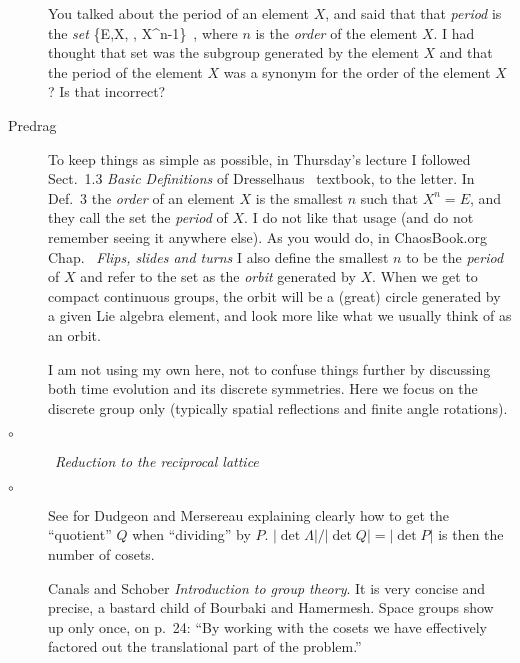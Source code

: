 \begin{description}
  \item[\student] %
You talked about the period of an element $X$, and said that that \emph{period}
is the \emph{set}
\beq
\{E,X, \cdots, X^{n-1}\}
\,,
where $n$ is the \emph{order} of the element $X$. I had thought that set was the
subgroup generated by the element $X$ and that the period of the element $X$
was a synonym for the order of the element $X$? Is that incorrect?

  \item[Predrag] %
                                         \toCB
To keep things as simple as possible, in Thursday's lecture I followed
Sect.~1.3 {\em Basic Definitions} of Dresselhaus \etal\
textbook, to the letter.
In Def.~3 the \emph{order} of an element $X$ is the smallest $n$
such that $X^n=E$, and they call the set \refeq{Xorbit} the \emph{period} of
$X$. I do not like that usage (and do not remember seeing it anywhere else).
As you would do, in ChaosBook.org
Chap.~ {\emph{Flips, slides
and turns}} I also define the smallest $n$ to be the \emph{period} of $X$ and
refer to the set \refeq{Xorbit} as the \emph{orbit} generated by $X$. When we
get to compact continuous groups, the orbit will be a (great) circle
generated by a given Lie algebra element, and look more like what we usually
think of as an orbit.

I am not using my own \wwwcb{} here, not to confuse things further by
discussing both time evolution and its discrete symmetries. Here we focus on
the discrete group only (typically spatial reflections and finite angle
rotations).

        \item[$\circ$]
~{\em Reduction to the reciprocal lattice}

        \item[$\circ$]
See  for
Dudgeon and Mersereau explaining clearly how to get the
``quotient'' $Q$ when ``dividing'' by $P$. $|\det\Lambda|/|\det Q| =
|\det P|$ is then the number of cosets.

        \itemBook
Canals and Schober
{\em Introduction to group theory}. It is very concise and precise,
a bastard child of Bourbaki and Hamermesh\rf{hamer}. Space groups show up
only once, on p.~24: ``By working with the cosets we have effectively
factored out the translational part of the problem.''

\end{description}

